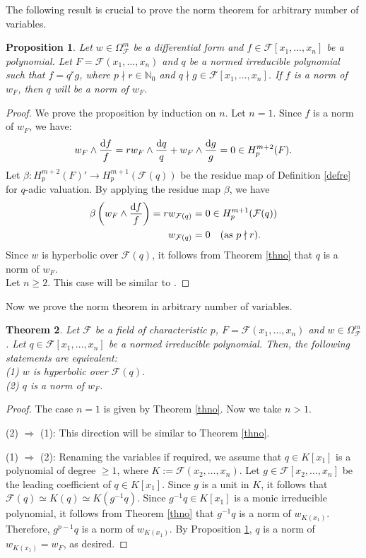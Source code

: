 \documentclass[times,10pt]{amsart}
\newcommand{\N}{\ensuremath{\mathbb{N}}}
\newcommand{\dd}{{\rm d}}
\newcommand{\F}{\ensuremath{\mathcal{F}}}
\renewcommand{\cong}{\simeq}
\newtheorem{thm}{Theorem}[section]
\newtheorem{prop}[thm]{Proposition}%
\begin{document}
           The following result is crucial to prove the norm theorem for arbitrary number of  variables.
 \begin{prop}
     \label{prn}
     Let $w\in \Omega_{\F}^m$ be a differential form and  $f\in \F[x_1,\ldots,x_n]$  be a polynomial.   Let $F=\F(x_1,\ldots,x_n)$ and  $q$ be a normed irreducible  polynomial such that  $ f =q^r g$, where $ p\nmid r\in \N_0$ and  $q\nmid g\in \F[x_1,\ldots,x_n]$. If $ f$ is a norm of $w_F$, then $q$ will  be  a norm of $w_F$. 
 \end{prop}
\begin{proof}We prove the proposition by induction on $n$. Let $n=1$. 
    Since $f$ is a norm of $w_F$, we have:\begin{align*}
        w_F\wedge \frac{\dd f}{f}=r w_F\wedge \frac{\dd q}{q}+w_F\wedge \frac{\dd g}{g}=0
    \in H_p^{m+2}(F).\end{align*} Let $\beta: H_p^{m+2}(F)'\xrightarrow{} H_p^{m+1}(\F(q))$ be the residue map of  Definition \ref{defre} for $q$-adic valuation. By applying the residue map $\beta$, we have \begin{align*}
        \beta\left( w_F\wedge \frac{\dd f}{f}\right)= r w_{\F(q)}&= 0\in H_p^{m+1}(\F(q))\\ w_{\F(q)}&=0\quad \text{(as $p\nmid r$)}.
    \end{align*}  Since $w$ is hyperbolic over $\F(q)$, it follows from  Theorem \ref{thno} that  $ q$ is a norm of $w_F$.\\
 Let $n\geq 2$. This case will be similar to  \cite[Proposition A.15, Step 2]{Appendix}.

\end{proof}
 Now  we prove the norm theorem   in arbitrary number of variables.
\begin{thm}\label{n2th} 
Let $\mathcal{F}$ be a field of characteristic $p$, $F=\F(x_1,\ldots,x_n)$ and $w\in \Omega_{\mathcal{F}}^m$. Let $q\in \mathcal{F}[x_1,\ldots,x_n]$ be a normed irreducible polynomial. Then, the following statements are equivalent:\\(1) $w$ is hyperbolic over $\mathcal{F}(q)$.\\(2) $q$ is a norm of $w_F$.
\end{thm}
\begin{proof}
The case $n=1$ is given by Theorem \ref{thno}.  Now we take  $n>1$. 

(2) $\Longrightarrow$ (1): This direction  will be similar to Theorem \ref{thno}.

(1) $\Longrightarrow$ (2): Renaming the variables if required, we assume that $ q\in K[x_1]$ is a polynomial of degree  $\geq 1$, where $K:=\F(x_2,\ldots,x_n)$. Let $g\in \F[x_2,\ldots,x_n]$ be the leading coefficient of $q\in K[x_1]$.  Since $g$ is a unit in $K$, it follows that $\F(q)\cong K(q)\cong K(g^{-1}q)$. Since $g^{-1}q\in K[x_1]$ is a monic irreducible polynomial, it follows from Theorem \ref{thno} that $ g^{-1}q$ is a norm of $w_{K(x_1)}$.  Therefore, $ g^{p-1} q$ is a norm of $w_{K(x_1)}$. By Proposition \ref{prn}, $q$ is a norm of   $w_{K(x_1)}=w_F$, as desired.
  \end{proof}
 
\end{document}
